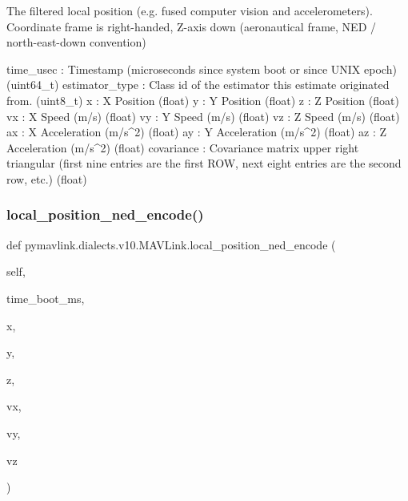 \begin{DoxyVerb}
\begin{DoxyVerb}
\begin{DoxyVerb}
\begin{DoxyVerb}
\begin{DoxyVerb}The filtered local position (e.g. fused computer vision and
accelerometers). Coordinate frame is right-handed,
Z-axis down (aeronautical frame, NED / north-east-down
convention)

time_usec                 : Timestamp (microseconds since system boot or since UNIX epoch) (uint64_t)
estimator_type            : Class id of the estimator this estimate originated from. (uint8_t)
x                         : X Position (float)
y                         : Y Position (float)
z                         : Z Position (float)
vx                        : X Speed (m/s) (float)
vy                        : Y Speed (m/s) (float)
vz                        : Z Speed (m/s) (float)
ax                        : X Acceleration (m/s^2) (float)
ay                        : Y Acceleration (m/s^2) (float)
az                        : Z Acceleration (m/s^2) (float)
covariance                : Covariance matrix upper right triangular (first nine entries are the first ROW, next eight entries are the second row, etc.) (float)\end{DoxyVerb}
 \mbox{\label{classpymavlink_1_1dialects_1_1v10_1_1MAVLink_a04bc0f5208fb7872becc7915cdc0b50a}} 
\subsubsection{\texorpdfstring{local\+\_\+position\+\_\+ned\+\_\+encode()}{local\_position\_ned\_encode()}}
{\footnotesize\ttfamily def pymavlink.\+dialects.\+v10.\+M\+A\+V\+Link.\+local\+\_\+position\+\_\+ned\+\_\+encode (\begin{DoxyParamCaption}\item[{}]{self,  }\item[{}]{time\+\_\+boot\+\_\+ms,  }\item[{}]{x,  }\item[{}]{y,  }\item[{}]{z,  }\item[{}]{vx,  }\item[{}]{vy,  }\item[{}]{vz }\end{DoxyParamCaption})}


\end{DoxyVerb}
\end{DoxyVerb}
\end{DoxyVerb}
\end{DoxyVerb}
